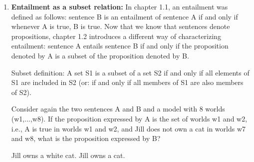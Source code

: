 \documentclass[a4,11pt]{article}
\begin{document}
\begin{enumerate}[leftmargin = 12pt]
\begin{exe}
 Jill owns a white cat.
 Jill owns a cat.
\end{exe}

      \begin{enumerate}[noitemsep]
       \item A: the set of worlds w1, w3, w5, w7, w9. \\ B: the set of worlds w1, w2, w3, w4, w5, w6, w7, w8, w9, w10. (0pts)
       \item A: the set of worlds w2, w4, w6, w8, w10. \\ B: the set of worlds w1, w2, w3, w4, w5, w6, w7, w8, w9, w10. (1pt)
       \item A: the set of worlds w1, w2, w3, w4, w5, w6, w7, w8, w9, w10. \\ B: the set of worlds w1, w3, w5, w7, w9.  (0pts)
       \item A: the set of worlds w1, w2, w3, w4, w5, w6, w7, w8, w9, w10. \\ B: the set of worlds w2, w4, w6, w8, w10. (0pts)
    \end{enumerate}    

 {\bf Model answer:} The correct answer is (b). Here, the proposition expressed by A are those 5 even-numbered worlds in which Jill owns a white cat and the proposition expressed by B are all 10 worlds (because Jill owns a cat in all 10 worlds).
 
\item {\bf Entailment as a subset relation:} In chapter 1.1, an entailment was defined as follows: sentence B is an entailment of sentence A if and only if whenever A is true, B is true. Now that we know that sentences denote propositions, chapter 1.2 introduces a different way of characterizing entailment: sentence A entails sentence B if and only if the proposition denoted by A is a subset of the proposition denoted by B. 

Subset definition: A set S1 is a subset of a set S2 if and only if all elements of S1 are included in S2 (or: if and only if all members of S1 are also members of S2).

Consider again the two sentences A and B and a model with 8 worlds (w1,...,w8). If the proposition expressed by A is the set of worlds w1 and w2, i.e., A is true in worlds w1 and w2, and Jill does not own a cat in worlds w7 and w8, what is the proposition expressed by B?

\begin{exe}
 Jill owns a white cat.
 Jill owns a cat.
\end{exe}


\end{enumerate}
\end{document}
